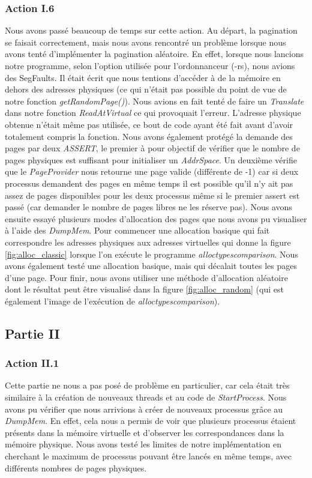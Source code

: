 \documentclass{article}
\begin{document}
\subsubsection{Action I.6}
Nous avons passé beaucoup de temps sur cette action. Au départ, la pagination se faisait 
correctement, mais nous avons rencontré un problème
lorsque nous avons tenté d'implémenter la pagination aléatoire. En effet, lorsque nous lancions
notre programme, selon l'option utilisée pour l'ordonnanceur (-rs), nous avions des SegFaults.
Il était écrit que nous tentions d'accéder à de la mémoire en dehors des adresses physiques (ce qui
n'était pas possible du point de vue de notre fonction \textit{getRandomPage()}). Nous avions en fait
tenté de faire un \textit{Translate} dans notre fonction \textit{ReadAtVirtual} ce qui provoquait
l'erreur. L'adresse physique obtenue n'était même pas utilisée, ce bout de code ayant
été fait avant d'avoir totalement compris la fonction. Nous avons également protégé la demande des pages par deux \textit{ASSERT},
le premier à pour objectif de vérifier que le nombre de pages physiques est suffisant pour initialiser un \textit{AddrSpace}.
Un deuxième vérifie que le \textit{PageProvider} nous retourne une page valide (différente de -1) car si deux processus demandent
des pages en même temps il est possible qu'il n'y ait pas assez de pages disponibles pour les deux processus même si le premier assert
est passé (car demander le nombre de pages libres ne les réserve pas). Nous avons ensuite essayé plusieurs modes d'allocation
des pages que nous avons pu visualiser à l'aide des \textit{DumpMem}. Pour commencer une allocation basique qui fait correspondre les adresses
physiques aux adresses virtuelles qui donne la figure \ref{fig:alloc_classic} lorsque l'on exécute le programme \textit{alloctypescomparison}.
Nous avons également testé une allocation basique, mais qui décalait toutes les pages d'une page. Pour finir, nous avons utiliser une méthode 
d'allocation aléatoire dont le résultat peut être visualisé dans la figure \ref{fig:alloc_random} (qui est également l'image de l'exécution 
de \textit{alloctypescomparison}).

\subsection{Partie II}

\subsubsection{Action II.1}
Cette partie ne nous a pas posé de problème en particulier, car cela était très similaire à la création 
de nouveaux threads et au code de \textit{StartProcess}. Nous avons pu vérifier que nous
arrivions à créer de nouveaux processus grâce au \textit{DumpMem}. En effet, cela nous a permis
de voir que plusieurs processus étaient présents dans la mémoire virtuelle et d'observer les
correspondances dans la mémoire physique. Nous avons testé les limites de notre implémentation
en cherchant le maximum de processus pouvant être lancés en même temps, avec différents nombres
de pages physiques.
\end{document}
